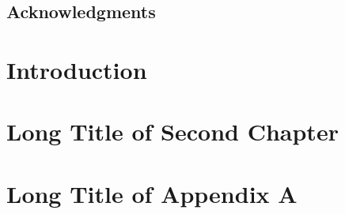 % 
% 
% 
% 
%






   \frontmatter

   \pagestyle{prelim}
   
   
   \newpage
   
   
   \tableofcontents
   \newpage
   
   
   \newpage
   
   \section*{Acknowledgments}
   
   
   \mainmatter
   
   \pagestyle{maintext}
   
   
   \chapter{Introduction}
   \label{ch:IntroductionLabel}
   

   \chapter[%
      Short Title of 2nd Ch.
   ]{%
      Long Title of Second Chapter
   }%
   \label{ch:2ndChapterLabel}
   
   
   \appendix

   \chapter[%
      Short Title of Appendix A
   ]{%
      Long Title of Appendix A
   }%
   \label{ch:AppendixALabel}
   
       
   \backmatter
   
   
   
